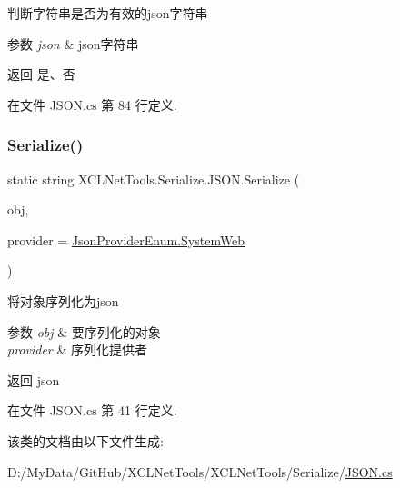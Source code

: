 判断字符串是否为有效的json字符串 


\begin{DoxyParams}{参数}
{\em json} & json字符串\\
\hline
\end{DoxyParams}
\begin{DoxyReturn}{返回}
是、否
\end{DoxyReturn}


在文件 J\+S\+O\+N.\+cs 第 84 行定义.

\mbox{\label{class_x_c_l_net_tools_1_1_serialize_1_1_j_s_o_n_aa37e98ab010f59d7454506b78ca8902e}} 
\subsubsection{\texorpdfstring{Serialize()}{Serialize()}}
{\footnotesize\ttfamily static string X\+C\+L\+Net\+Tools.\+Serialize.\+J\+S\+O\+N.\+Serialize (\begin{DoxyParamCaption}\item[{object}]{obj,  }\item[{\hyperlink{class_x_c_l_net_tools_1_1_serialize_1_1_j_s_o_n_acb00f7258e4dedfaa0cec15ce9335a31}{Json\+Provider\+Enum}}]{provider = {\ttfamily \hyperlink{class_x_c_l_net_tools_1_1_serialize_1_1_j_s_o_n_acb00f7258e4dedfaa0cec15ce9335a31a67a1b1b70420ea0e3be332a9dedcb83e}{Json\+Provider\+Enum.\+System\+Web}} }\end{DoxyParamCaption})\hspace{0.3cm}{\ttfamily [static]}}



将对象序列化为json 


\begin{DoxyParams}{参数}
{\em obj} & 要序列化的对象\\
\hline
{\em provider} & 序列化提供者\\
\hline
\end{DoxyParams}
\begin{DoxyReturn}{返回}
json
\end{DoxyReturn}


在文件 J\+S\+O\+N.\+cs 第 41 行定义.



该类的文档由以下文件生成\+:\begin{DoxyCompactItemize}
\item 
D\+:/\+My\+Data/\+Git\+Hub/\+X\+C\+L\+Net\+Tools/\+X\+C\+L\+Net\+Tools/\+Serialize/\hyperlink{_j_s_o_n_8cs}{J\+S\+O\+N.\+cs}\end{DoxyCompactItemize}
